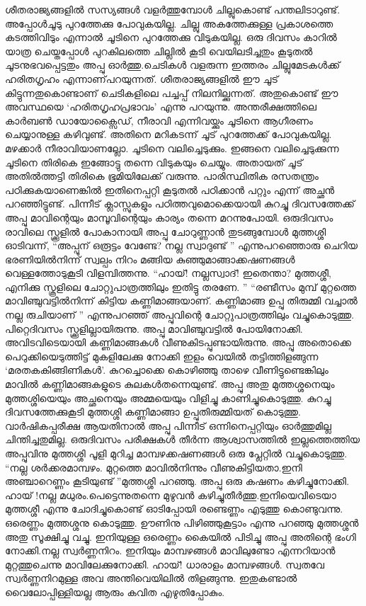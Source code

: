 ശീതരാജ്യങ്ങളിൽ സസ്യങ്ങൾ വളർത്തുമ്പോൾ ചില്ലുകൊണ്ട് പന്തലിടാറുണ്ട്. അപ്പോൾചൂടു പുറത്തേക്കു പോവുകയില്ല. ചില്ലു അകത്തേക്കുള്ള പ്രകാശത്തെ കടത്തിവിടും എന്നാൽ ചൂടിനെ പുറത്തേക്കു വിടുകയില്ല. ഒരു ദിവസം കാറിൽ യാത്ര ചെയ്തപ്പോൾ പുറകിലത്തെ ചില്ലിൽ കൂടി വെയിലടിച്ചതും കൂടുതൽ ചൂടനുഭവപ്പെട്ടതും അപ്പു ഓർത്തു.ചെടികൾ വളരുന്ന ഇത്തരം ചില്ലുമേടകൾക്ക് ഹരിതഗൃഹം എന്നാണ്‌പറയുന്നത്. ശീതരാജ്യങ്ങളിൽ ഈ ചൂട് കിട്ടുന്നതുകൊണ്ടാണ്‌ ചെടികളിലെ പച്ചപ്പ് നിലനില്ക്കുന്നത്. അതുകൊണ്ട് ഈ അവസ്ഥയെ ‘ഹരിതഗൃഹപ്രഭാവം’ എന്നു പറയുന്നു. അന്തരീക്ഷത്തിലെ കാർബൺ ഡായോക്സൈഡ്, നീരാവി എന്നിവയ്ക്കും ചൂടിനെ ആഗീരണം ചെയ്യാനുള്ള കഴിവുണ്ട്. അതിനെ മറികടന്ന് ചൂട് പുറത്തേക്ക് പോവുകയില്ല. മഴക്കാർ നീരാവിയാണല്ലോ. ചൂടിനെ വലിച്ചെടുക്കും. ഇങ്ങനെ വലിച്ചെടുക്കുന്ന ചൂടിനെ തിരികെ ഇങ്ങോട്ടു തന്നെ വിടുകയും ചെയ്യും. അതായത് ചൂട് അതിൽത്തട്ടി തിരികെ ഭൂമിയിലേക്ക് വരുന്നു. പാരിസ്ഥിതിക രസതന്ത്രം പഠിക്കുകയാണെങ്കിൽ ഇതിനെപ്പറ്റി കൂടുതൽ പഠിക്കാൻ പറ്റും എന്ന് അച്ഛൻ പറഞ്ഞിട്ടുണ്ട്. പിന്നീട് ക്ലാസ്സുകളും പഠിത്തവുമൊക്കെയായി കുറച്ചു ദിവസത്തേക്ക് അപ്പു മാവിന്റെയും മാമ്പൂവിന്റെയും കാര്യം തന്നെ മറന്നുപോയി.
ഒരുദിവസം രാവിലെ സ്ക്കൂളിൽ പോകാനായി അപ്പു ചോറുണ്ണാൻ തുടങ്ങുമ്പോൾ മുത്തശ്ശി ഓടിവന്ന്, “അപ്പൂന്‌ ഒരൂട്ടം വേണ്ടേ? നല്ല സ്വാദുണ്ട് ” എന്നുപറഞ്ഞൊരു ചെറിയ ഭരണിയിൽനിന്ന് സ്വല്പം നിറം മങ്ങിയ കുഞ്ഞുമാങ്ങാക്കഷണങ്ങൾ വെള്ളത്തോടുകൂടി വിളമ്പിത്തന്നു.
“ഹായ്! നല്ലസ്വാദ്! ഇതെന്താ? മുത്തശ്ശീ, എനിക്കു സ്കൂളിലെ ചോറ്റുപാത്രത്തിലും ഇതിട്ടു തരണേ. ”
“രണ്ടീസം മുമ്പ് മുറ്റത്തെ മാവിഞ്ചുവട്ടിൽനിന്ന് കിട്ടിയ കണ്ണിമാങ്ങയാണ്‌. കണ്ണിമാങ്ങ ഉപ്പു തിരുമ്മി വച്ചാൽ നല്ല രുചിയാണ്‌ ” എന്നുപറഞ്ഞ് അപ്പുവിന്റെ ചോറ്റുപാത്രത്തിലും വച്ചുകൊടുത്തു.
പിറ്റെദിവസം സ്ക്കൂളില്ലായിരുന്നു. അപ്പു മാവിഞ്ചുവട്ടിൽ പോയിനോക്കി. അവിടവിടെയായി കണ്ണിമാങ്ങകൾ വീണുകിടപ്പുണ്ടായിരുന്നു. അപ്പു അതൊക്കെ പെറുക്കിയെടുത്തിട്ട് മുകളിലേക്കു നോക്കി ഇളം വെയിൽ തട്ടിത്തിളങ്ങുന്ന ‘മരതകകിങ്ങിണികൾ’. കുറച്ചൊക്കെ കൊഴിഞ്ഞു താഴെ വീണിട്ടുണ്ടെങ്കിലും മാവിൽ കണ്ണിമാങ്ങകളുടെ കുലകൾതന്നെയുണ്ട്. അപ്പു അതു മുത്തശ്ശനെയും മുത്തശ്ശിയെയും അച്ഛനെയും അമ്മയെയും വിളിച്ചു കാണിച്ചുകൊടുത്തു.
കുറച്ചു ദിവസത്തേക്കുകൂടി മുത്തശ്ശി കണ്ണിമാങ്ങാ ഉപ്പുതിരുമ്മിയത് കൊടുത്തു. വാർഷികപ്പരീക്ഷ ആയതിനാൽ അപ്പു പിന്നീട് ഒന്നിനെപ്പറ്റിയും ഓർത്തുമില്ല ചിന്തിച്ചതുമില്ല.
ഒരുദിവസം പരീക്ഷകൾ തീർന്ന ആശ്വാസത്തിൽ ഇല്ലത്തെത്തിയ അപ്പുവിനു മുത്തശ്ശി പൂളി മുറിച്ച മാമ്പഴക്കഷണങ്ങൾ ഒരു പ്ലേറ്റിൽ വച്ചുകൊടുത്തു. “നല്ല ശർക്കരമാമ്പഴം. മുറ്റത്തെ മാവിൽനിന്നും വീണുകിട്ടിയതാ.ഇനി അഞ്ചാറെണ്ണം കൂടിയുണ്ട് ”മുത്തശ്ശി പറഞ്ഞു.
അപ്പു ഒരു കഷണം കഴിച്ചുനോക്കി. ഹായ് !നല്ല മധുരം.പെട്ടെന്നുതന്നെ മുഴുവൻ കഴിച്ചുതീർത്തു.ഇനിയെവിടെയാ മുത്തശ്ശീ എന്നു ചോദിച്ചുകൊണ്ട് ഓടിപ്പോയി രണ്ടെണ്ണം എടുത്തു കൊണ്ടുവന്നു. ഒരെണ്ണം മുത്തശ്ശനു കൊടുത്തു. ഊണിനു പിഴിഞ്ഞുകൂട്ടാം എന്നു പറഞ്ഞു മുത്തശ്ശൻ അതു സൂക്ഷിച്ചു വച്ചു. ഇനിയുള്ള ഒരെണ്ണം കൈയിൽ പിടിച്ചു അപ്പു അതിന്റെ ഭംഗി നോക്കി.നല്ല സ്വർണ്ണനിറം. ഇനിയും മാമ്പഴങ്ങൾ മാവിലുണ്ടോ എന്നറിയാൻ മുറ്റത്തുചെന്നു മാവിലേക്കുനോക്കി. ഹായ്! ധാരാളം മാമ്പഴങ്ങൾ. സ്വതവേ സ്വർണ്ണനിറമുള്ള അവ അന്തിവെയിലിൽ തിളങ്ങുന്നു. ഇതുകണ്ടാൽ വൈലോപ്പിള്ളിയല്ല ആരും കവിത എഴുതിപ്പോകും.
